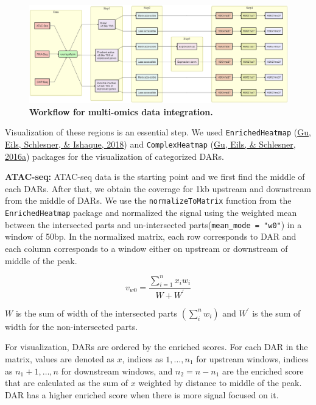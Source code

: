 \documentclass[12pt,twoside]{reedthesis}
\begin{document}
\newpage
\begin{landscape}


\begin{figure}[htbp]

{\centering \includegraphics{thesis_files/figure-latex/mf8-1} 

}

\caption[Workflow for multi-omics data integration]{\textbf{Workflow for multi-omics data integration.}}\label{fig:mf8}
\end{figure}
\end{landscape}
Visualization of these regions is an essential step. We used
\texttt{EnrichedHeatmap} (\protect\hyperlink{ref-gu2018}{Gu, Eils, Schlesner, \& Ishaque, 2018}) and \texttt{ComplexHeatmap} (\protect\hyperlink{ref-gu2016}{Gu, Eils, \& Schlesner, 2016a}) packages for the
visualization of categorized DARs.

\textbf{ATAC-seq:} ATAC-seq data is the starting point and we first find the
middle of each DARs. After that, we obtain the coverage for 1kb upstream
and downstream from the middle of DARs. We use the \texttt{normalizeToMatrix}
function from the \texttt{EnrichedHeatmap} package and normalized the signal
using the weighted mean between the intersected parts and un-intersected
parts(\texttt{mean\_mode\ =\ "w0"}) in a window of 50bp. In the normalized matrix,
each row corresponds to DAR and each column corresponds to a window
either on upstream or downstream of middle of the peak.

\[
v_{w 0}=\frac{\sum_{i=1}^{n} x_{i} w_{i}}{W+W^{\prime}}
\]

\({W}\) is the sum of width of the intersected parts
\(\left(\sum_{i}^{n} w_{i}\right)\) and \(W^{\prime}\) is the sum of width
for the non-intersected parts.

For visualization, DARs are ordered by the enriched scores. For each DAR
in the matrix, values are denoted as \({x}\), indices as
\(1, \ldots, n_{1}\) for upstream windows, indices as \(n_{1}+1, \ldots, n\)
for downstream windows, and \(n_{2}=n-n_{1}\) are the enriched score that
are calculated as the sum of \({x}\) weighted by distance to middle of the
peak. DAR has a higher enriched score when there is more signal focused
on it.
\end{document}
